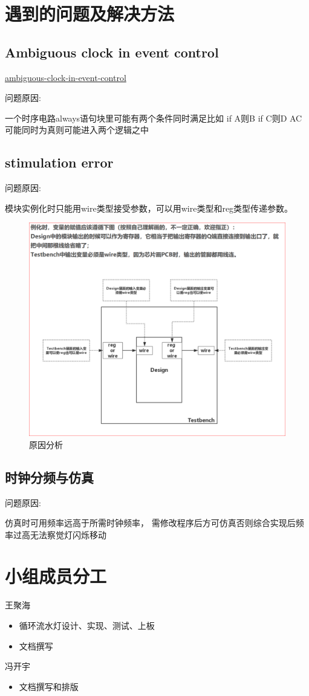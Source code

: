 \documentclass[UTF8]{article}
\begin{document}
\section{遇到的问题及解决方法}
\subsection{Ambiguous clock in event control}

\href{https://stackoverflow.com/questions/27145548/ambiguous-clock-in-event-control}{ambiguous-clock-in-event-control} 

问题原因: 

一个时序电路always语句块里可能有两个条件同时满足比如
    if A则B
    if C则D
AC可能同时为真则可能进入两个逻辑之中

\subsection{stimulation error}
问题原因:

模块实例化时只能用wire类型接受参数，可以用wire类型和reg类型传递参数。

\begin{figure}[H]
    \centering
    \includegraphics[width=\linewidth]{0.PNG}
    \caption{原因分析}
    \label{FIG.12}
\end{figure}

\subsection{时钟分频与仿真}
问题原因: 

仿真时可用频率远高于所需时钟频率，
需修改程序后方可仿真否则综合实现后频率过高无法察觉灯闪烁移动
\section{小组成员分工}

王聚海
\begin{itemize}
    \item 循环流水灯设计、实现、测试、上板
    \item 文档撰写
\end{itemize}

冯开宇
\begin{itemize}
    \item 文档撰写和排版
\end{itemize}
\end{document}
